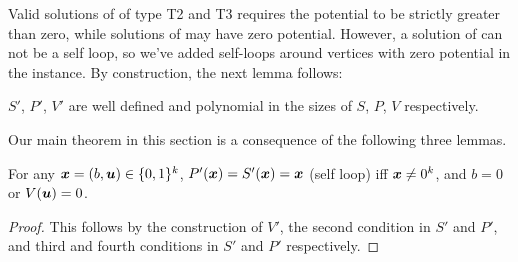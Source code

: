 Valid solutions of \EOML of type T2 and T3 requires the potential to be strictly greater than zero, while solutions of \EOPL may have zero potential. However, a solution of \EOPL can not be a self loop, so we've added self-loops around vertices with zero potential in the \EOPL instance.
By construction, the next lemma follows:
\begin{lemma}\label{lem:m2p-valid}
$S'$, $P'$, $V'$ are well defined and polynomial in the sizes of $S$, $P$, $V$ respectively. 
\end{lemma}

Our main theorem in this section is a consequence of the following three lemmas.

\begin{lemma}\label{lem:m2p-sl}
For any $\mbox{\boldmath $x$}=(b,\mbox{\boldmath $u$})\in \{0,1\}^k$, $P'(\mbox{\boldmath $x$})=S'(\mbox{\boldmath $x$})=\mbox{\boldmath $x$}$ (self loop) iff $\mbox{\boldmath $x$}\neq 0^k$, and $b=0$ or $V(\mbox{\boldmath $u$})=0$.
\end{lemma}
\begin{proof}
This follows by the construction of $V'$, the second condition in $S'$ and $P'$, and third and fourth conditions in $S'$ and $P'$ respectively. 
\end{proof}

